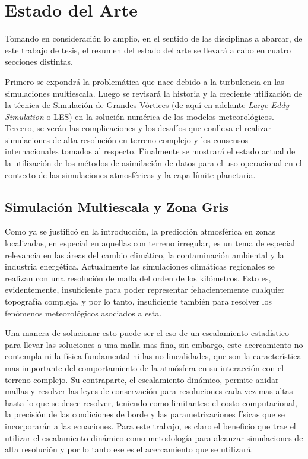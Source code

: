 \chapter{Estado del Arte}
Tomando en consideración lo amplio, en el sentido de las disciplinas a abarcar, de este trabajo de tesis, el resumen del estado del arte se llevará a cabo en cuatro secciones distintas. 

Primero se expondrá la problemática que nace debido a la turbulencia en las simulaciones multiescala. Luego se revisará la historia y la creciente utilización de la técnica de Simulación de Grandes Vórtices (de aquí en adelante \emph{Large Eddy Simulation} o LES) en la solución numérica de los modelos meteorológicos. Tercero, se verán las complicaciones y los desafíos que conlleva el realizar simulaciones de alta resolución en terreno complejo y los consensos internacionales tomados al respecto. Finalmente se mostrará el estado actual de la utilización de los métodos de asimilación de datos para el uso operacional en el contexto de las simulaciones atmosféricas y la capa límite planetaria.
\newpage
\section{Simulación Multiescala y Zona Gris}
Como ya se justificó en la introducción, la predicción atmosférica en zonas localizadas, en especial en aquellas con terreno irregular, es un tema de especial relevancia en las áreas del cambio climático, la contaminación ambiental y la industria energética. Actualmente las simulaciones climáticas regionales se realizan con una resolución de malla del orden de los kilómetros. Esto es, evidentemente, insuficiente para poder representar fehacientemente cualquier topografía compleja, y por lo tanto, insuficiente también para resolver los fenómenos meteorológicos asociados a esta.

Una manera de solucionar esto puede ser el eso de un escalamiento estadístico para llevar las soluciones a una malla mas fina, sin embargo, este acercamiento no contempla ni la física fundamental ni las no-linealidades, que son la característica mas importante del comportamiento de la atmósfera en su interacción con el terreno complejo. Su contraparte, el escalamiento dinámico, permite anidar mallas y resolver las leyes de conservación para resoluciones cada vez mas altas hasta lo que se desee resolver, teniendo como limitantes: el costo computacional, la precisión de las condiciones de borde y las parametrizaciones físicas que se incorporarán a las ecuaciones. Para este trabajo, es claro el beneficio que trae el utilizar el escalamiento dinámico como metodología para alcanzar simulaciones de alta resolución y por lo tanto ese es el acercamiento que se utilizará.


